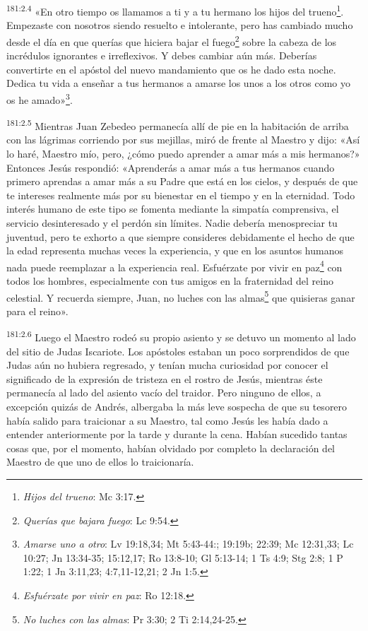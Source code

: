 \par
\textsuperscript{181:2.4} «En otro tiempo os llamamos a ti y a tu hermano los hijos del trueno\footnote{\textit{Hijos del trueno}: Mc 3:17.}. Empezaste con nosotros siendo resuelto e intolerante, pero has cambiado mucho desde el día en que querías que hiciera bajar el fuego\footnote{\textit{Querías que bajara fuego}: Lc 9:54.} sobre la cabeza de los incrédulos ignorantes e irreflexivos. Y debes cambiar aún más. Deberías convertirte en el apóstol del nuevo mandamiento que os he dado esta noche. Dedica tu vida a enseñar a tus hermanos a amarse los unos a los otros como yo os he amado»\footnote{\textit{Amarse uno a otro}: Lv 19:18,34; Mt 5:43-44:; 19:19b; 22:39; Mc 12:31,33; Lc 10:27; Jn 13:34-35; 15:12,17; Ro 13:8-10; Gl 5:13-14; 1 Ts 4:9; Stg 2:8; 1 P 1:22; 1 Jn 3:11,23; 4:7,11-12,21; 2 Jn 1:5.}.

\par
\textsuperscript{181:2.5} Mientras Juan Zebedeo permanecía allí de pie en la habitación de arriba con las lágrimas corriendo por sus mejillas, miró de frente al Maestro y dijo: «Así lo haré, Maestro mío, pero, ¿cómo puedo aprender a amar más a mis hermanos?» Entonces Jesús respondió: «Aprenderás a amar más a tus hermanos cuando primero aprendas a amar más a su Padre que está en los cielos, y después de que te intereses realmente más por su bienestar en el tiempo y en la eternidad. Todo interés humano de este tipo se fomenta mediante la simpatía comprensiva, el servicio desinteresado y el perdón sin límites. Nadie debería menospreciar tu juventud, pero te exhorto a que siempre consideres debidamente el hecho de que la edad representa muchas veces la experiencia, y que en los asuntos humanos nada puede reemplazar a la experiencia real. Esfuérzate por vivir en paz\footnote{\textit{Esfuérzate por vivir en paz}: Ro 12:18.} con todos los hombres, especialmente con tus amigos en la fraternidad del reino celestial. Y recuerda siempre, Juan, no luches con las almas\footnote{\textit{No luches con las almas}: Pr 3:30; 2 Ti 2:14,24-25.} que quisieras ganar para el reino».

\par
\textsuperscript{181:2.6} Luego el Maestro rodeó su propio asiento y se detuvo un momento al lado del sitio de Judas Iscariote. Los apóstoles estaban un poco sorprendidos de que Judas aún no hubiera regresado, y tenían mucha curiosidad por conocer el significado de la expresión de tristeza en el rostro de Jesús, mientras éste permanecía al lado del asiento vacío del traidor. Pero ninguno de ellos, a excepción quizás de Andrés, albergaba la más leve sospecha de que su tesorero había salido para traicionar a su Maestro, tal como Jesús les había dado a entender anteriormente por la tarde y durante la cena. Habían sucedido tantas cosas que, por el momento, habían olvidado por completo la declaración del Maestro de que uno de ellos lo traicionaría.

